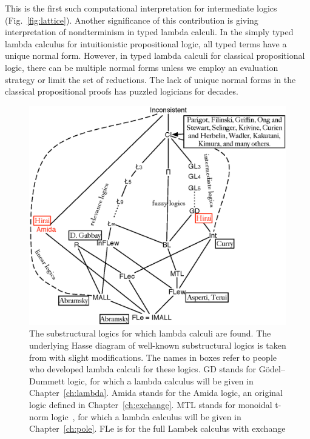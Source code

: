 This is the first such computational
interpretation for intermediate logics (Fig.~\ref{fig:lattice}).
Another significance of this contribution
is giving interpretation of nondterminism in typed
lambda calculi.  In the simply typed lambda calculus for intuitionistic
propositional logic, all typed terms have a unique normal form.
However, in typed lambda calculi for classical propositional logic,
there can be multiple normal forms unless we employ an evaluation
strategy or limit the set of reductions.
The lack of unique normal forms in the classical propositional proofs
has puzzled logicians for decades. 
 \begin{figure}
  \centering
  \includegraphics[scale=0.8]{lattice.eps}
  \caption[The lattice of substructural logics, some of which with known lambda calculi.]
  {The substructural logics for which lambda calculi are found.
  The underlying Hasse diagram of well-known substructural logics is
  taken from
  \cite[p.~120]{residuated} with slight modifications.
  The names in boxes refer to people who developed lambda calculi for
  these logics.
  \textsf{GD} stands for G\"odel--Dummett logic, for which
  a lambda calculus will be given in
  Chapter~\ref{ch:lambda}.
  \textsf{Amida} stands for the Amida logic, an original logic
  defined in Chapter~\ref{ch:exchange}.
  \textsf{MTL} stands for monoidal t-norm logic~\citep{Esteva2001271},
  for which a lambda calculus will be given
  in Chapter~\ref{ch:pole}.
  \textsf{FLe} is for the full Lambek calculus with exchange
}
\end{figure}
